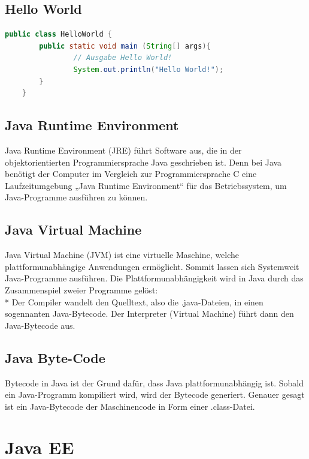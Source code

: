 \subsection{Hello World}
\author{David Ignjatovic} 
\begin{lstlisting}[language=Java,caption=Java File HelloWorld,label=lst:impl:foo]
    public class HelloWorld {
        public static void main (String[] args){
                // Ausgabe Hello World!
                System.out.println("Hello World!");
        }
    }
    \end{lstlisting}

\subsection{Java Runtime Environment }
\author{David Ignjatovic} 

Java Runtime Environment (JRE) führt Software aus, die in der objektorientierten Programmiersprache Java geschrieben ist. 
Denn bei Java benötigt der Computer im Vergleich zur Programmiersprache C eine Laufzeitumgebung „Java Runtime Environment“ für das Betriebssystem, um Java-Programme ausführen zu können. \cite{JRE}

\subsection{Java Virtual Machine}
\author{David Ignjatovic} 

Java Virtual Machine (JVM) ist eine virtuelle Maschine, welche plattformunabhängige Anwendungen ermöglicht. Sommit lassen sich Systemweit Java-Programme ausführen.
Die Plattformunabhängigkeit wird in Java durch das Zusammenspiel zweier Programme gelöst: \\*
Der Compiler wandelt den Quelltext, also die .java-Dateien, in einen sogennanten Java-Bytecode. Der Interpreter (Virtual Machine) führt dann den Java-Bytecode aus. \cite{JVM}

\subsection{Java Byte-Code}
\author{David Ignjatovic} 

Bytecode in Java ist der Grund dafür, dass Java plattformunabhängig ist. Sobald ein Java-Programm kompiliert wird, wird der Bytecode generiert. 
Genauer gesagt ist ein Java-Bytecode der Maschinencode in Form einer .class-Datei.

\section{Java EE}
\author{David Ignjatovic} 


